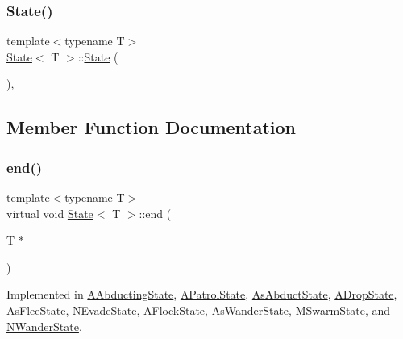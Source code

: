 \mbox{\label{class_state_a36b8d88556e052c69379bf7813396c21}} 
\subsubsection{\texorpdfstring{State()}{State()}\hspace{0.1cm}{\footnotesize\ttfamily [3/3]}}
{\footnotesize\ttfamily template$<$typename T$>$ \\
\hyperlink{class_state}{State}$<$ T $>$\+::\hyperlink{class_state}{State} (\begin{DoxyParamCaption}{ }\end{DoxyParamCaption})\hspace{0.3cm}{\ttfamily [inline]}, {\ttfamily [protected]}}



\subsection{Member Function Documentation}
\mbox{\label{class_state_a97d058722f988c008e912a0e5ec879b3}} 
\subsubsection{\texorpdfstring{end()}{end()}}
{\footnotesize\ttfamily template$<$typename T$>$ \\
virtual void \hyperlink{class_state}{State}$<$ T $>$\+::end (\begin{DoxyParamCaption}\item[{T $\ast$}]{ }\end{DoxyParamCaption})\hspace{0.3cm}{\ttfamily [pure virtual]}}



Implemented in \hyperlink{class_a_abducting_state_a618a6c11d2dc823b11161ff3a0c88ef8}{A\+Abducting\+State}, \hyperlink{class_a_patrol_state_ad4e43d5ad9c9aa4ec543b836b58c06e8}{A\+Patrol\+State}, \hyperlink{class_as_abduct_state_a28ceb4aad2ec8dc1c07c584cf9f9778f}{As\+Abduct\+State}, \hyperlink{class_a_drop_state_a6af566dd1e06d425f16a69bbd11e811f}{A\+Drop\+State}, \hyperlink{class_as_flee_state_a58912e7f5eed181065942f81d2e4e22a}{As\+Flee\+State}, \hyperlink{class_n_evade_state_a2bdb23a457b6ef01dee943c0c26da079}{N\+Evade\+State}, \hyperlink{class_a_flock_state_af81fa7c9e9eb5185e8cd950aceb758f3}{A\+Flock\+State}, \hyperlink{class_as_wander_state_ab225e3074b252027cfd84f8fe9171e1c}{As\+Wander\+State}, \hyperlink{class_m_swarm_state_aa9ac4ceacb0282421abcbf7fa1d6f217}{M\+Swarm\+State}, and \hyperlink{class_n_wander_state_acfff1d26985924da7d3c540a9399dd1d}{N\+Wander\+State}.

